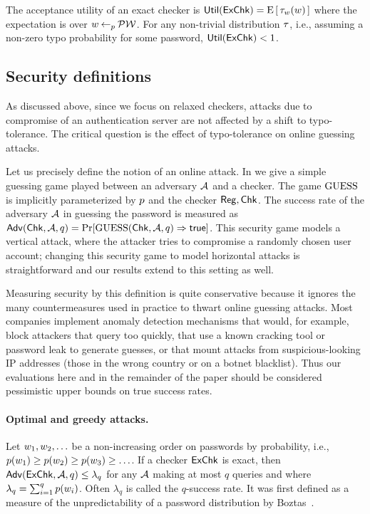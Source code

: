 The acceptance utility of an exact checker is 
$\textnormal{\textsf{Util}}(\textnormal{\textsf{ExChk}}) = {\textnormal{E}\left[\,{\tau_{w}({w})}\,\right]}$ where the expectation is 
over ${w} {\:\leftarrow_{p}\:} \mathcal{PW}$.
For any non-trivial distribution $\tau$, i.e., assuming a non-zero typo probability for some password, 
$\textnormal{\textsf{Util}}(\textnormal{\textsf{ExChk}}) < 1$.


\subsection{Security definitions}
\label{subsec:security}

As discussed above, since we focus on relaxed checkers, attacks due to
compromise of an authentication server are not affected by a shift
to typo-tolerance. The
critical question is the effect of typo-tolerance on online
guessing attacks. 

Let us precisely define the notion of an online attack. In  we give a simple guessing game
played between an adversary $\advA$ and a checker. The game $\textnormal{GUESS}$ is
implicitly parameterized by $p$ and the checker
$\textnormal{\textsf{Reg}},\textnormal{\textsf{Chk}}$. The success rate of the adversary $\advA$ in
guessing the password is measured as
$\advantage(\checker,\advA,q) = \Pr[\ATT(\checker,\advA,q)\Rightarrow\true]$.  
This security
game models a vertical attack, where the attacker tries to compromise
a randomly chosen user account; changing this security game to model
horizontal attacks is straightforward and our results extend to this setting as
well.

Measuring security by this definition is quite conservative because it ignores
the many countermeasures used in practice to thwart online guessing attacks.
Most companies implement anomaly detection mechanisms that would, for example,
block attackers that query too quickly, that use a known cracking tool or
password leak to generate guesses, or that mount attacks from suspicious-looking
IP addresses (those in the wrong country or on a botnet blacklist). Thus our
evaluations here and in the remainder of the paper should be considered
pessimistic upper bounds on true success rates. 

\paragraph{Optimal and greedy attacks.} Let ${w}_1, {w}_2, \ldots$ be a non-increasing
order on passwords by probability, i.e., $p({w}_1) \geq p({w}_{2}) \geq p({w}_{3}) \geq  \ldots$.
If a checker $\textnormal{\textsf{ExChk}}$ is exact, then
$\advantage(\exchecker,\advA,q) \le \lambda_q$ for any $\advA$ making at
most $q$ queries and where $\lambda_q = \sum_{i=1}^q p({w}_i)$.
Often $\lambda_q$ is called the $q$-success rate. It was first defined as a measure of the
unpredictability of a password distribution by
Boztas~\cite{boztas1999entropies}.

